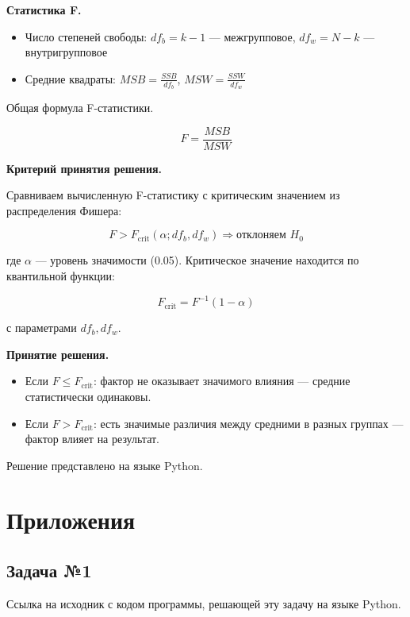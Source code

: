 \documentclass[12pt]{article}
\begin{document}
	\textbf{Статистика F.}
	
	\begin{itemize}
		\item Число степеней свободы:
		$df_b = k - 1$ — межгрупповое, $df_w = N - k$ — внутригрупповое
		
		\item Средние квадраты: $MSB = \frac{SSB}{df_b}$, $MSW = \frac{SSW}{df_w}$
	\end{itemize}
	
	Общая формула F-статистики.
	
	$$ F = \frac{MSB}{MSW} $$
	
	\textbf{Критерий принятия решения.}
	
	Сравниваем вычисленную F-статистику с критическим значением из распределения Фишера:
	
	$$ F > F_{\text{crit}}(\alpha; df_b, df_w) \Rightarrow \text{отклоняем } H_0 $$
	
	где $\alpha$ — уровень значимости (0.05).
	Критическое значение находится по квантильной функции:
	
	$$ F_{\text{crit}} = F^{-1}(1 - \alpha) $$
	
	с параметрами $df_b, df_w$.
	\vspace*{1em}
	
	\textbf{Принятие решения.}
	
	\begin{itemize}
		\item Если $F \leq F_{\text{crit}}$: фактор не оказывает значимого влияния — средние статистически одинаковы.
		
		\item Если $F > F_{\text{crit}}$: есть значимые различия между средними в разных группах — фактор влияет на результат.
	\end{itemize}
	
	Решение представлено на языке Python.
	\newpage
	
	\section*{Приложения}
	
	\subsection*{Задача №1}
	
	Ссылка на исходник с кодом программы, решающей эту задачу на языке Python. \cite{TaskNumber1}
	
\end{document}
